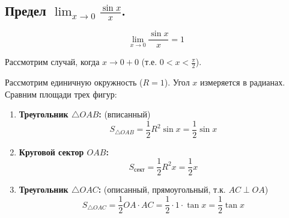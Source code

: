 \subsection{Предел $\lim_{x\to 0} \frac{\sin x}{x}$.}

\[ \lim_{x \to 0} \frac{\sin x}{x} = 1 \]

\begin{tcolorbox}[title=Доказательство]
    Рассмотрим случай, когда $x \to 0+0$ (т.е. $0 < x < \frac{\pi}{2}$).
    
    \begin{center}
\end{center}

    Рассмотрим единичную окружность ($R=1$). Угол $x$ измеряется в радианах.
    Сравним площади трех фигур:
    \begin{enumerate}
        \item \textbf{Треугольник $\triangle OAB$:} (вписанный)
        \[ S_{\triangle OAB} = \frac{1}{2} R^2 \sin x = \frac{1}{2} \sin x \]
        \item \textbf{Круговой сектор $OAB$:}
        \[ S_{\text{сект}} = \frac{1}{2} R^2 x = \frac{1}{2} x \]
        \item \textbf{Треугольник $\triangle OAC$:} (описанный, прямоугольный, т.к. $AC \perp OA$)
        \[ S_{\triangle OAC} = \frac{1}{2} OA \cdot AC = \frac{1}{2} \cdot 1 \cdot \tan x = \frac{1}{2} \tan x \]
    \end{enumerate}


\end{tcolorbox}

